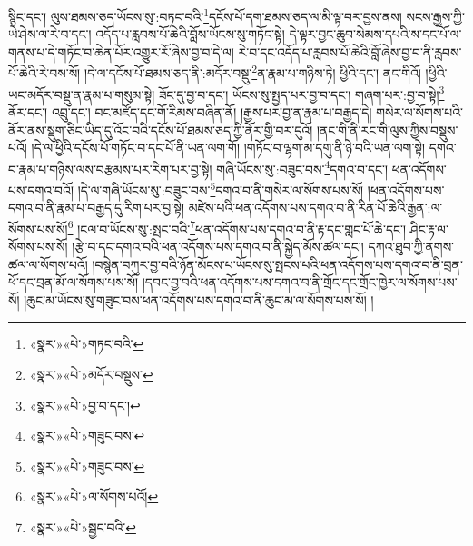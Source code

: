 སྙིང་དང་། ལུས་ཐམས་ཅད་ཡོངས་སུ་:བཏང་བའི་\footnote{«སྣར་»«པེ་»གཏང་བའི་}དངོས་པོ་དག་ཐམས་ཅད་ལ་མི་ལྟ་བར་བྱས་ནས། སངས་རྒྱས་ཀྱི་ཡེ་ཤེས་ལ་རེ་བ་དང་། འདོད་པ་རླབས་པོ་ཆེའི་བློས་ཡོངས་སུ་གཏོང་སྟེ། དེ་ལྟར་བྱང་ཆུབ་སེམས་དཔའི་ས་དང་པོ་ལ་གནས་པ་དེ་གཏོང་བ་ཆེན་པོར་འགྱུར་རོ་ཞེས་བྱ་བ་དེ་ལ། རེ་བ་དང་འདོད་པ་རླབས་པོ་ཆེའི་བློ་ཞེས་བྱ་བ་ནི་རླབས་པོ་ཆེའི་རེ་བས་སོ། །དེ་ལ་དངོས་པོ་ཐམས་ཅད་ནི་:མདོར་བསྡུ་\footnote{«སྣར་»«པེ་»མདོར་བསྡུས་}ན་རྣམ་པ་གཉིས་ཏེ། ཕྱིའི་དང་། ནང་གིའོ། །ཕྱིའི་ཡང་མདོར་བསྡུ་ན་རྣམ་པ་གསུམ་སྟེ། ཟོང་དུ་བྱ་བ་དང་། ཡོངས་སུ་སྤྱད་པར་བྱ་བ་དང་། གཞག་པར་:བྱ་བ་སྟེ།\footnote{«སྣར་»«པེ་»བྱ་བ་དང་།} ནོར་དང་། འབྲུ་དང་། བང་མཛོད་དང་གོ་རིམས་བཞིན་ནོ། །རྒྱས་པར་བྱ་ན་རྣམ་པ་བརྒྱད་དེ། གསེར་ལ་སོགས་པའི་ནོར་ནས་སྡུག་ཅིང་ཡིད་དུ་འོང་བའི་དངོས་པོ་ཐམས་ཅད་ཀྱི་ནོར་གྱི་བར་དུའོ། །ནང་གི་ནི་རང་གི་ལུས་ཀྱིས་བསྡུས་པའོ། །དེ་ལ་ཕྱིའི་དངོས་པོ་གཏོང་བ་དང་པོ་ནི་ཡན་ལག་གོ། །གཏོང་བ་ལྷག་མ་དགུ་ནི་ཉེ་བའི་ཡན་ལག་སྟེ། དགའ་བ་རྣམ་པ་གཉིས་ལས་བརྩམས་པར་རིག་པར་བྱ་སྟེ། གཞི་ཡོངས་སུ་:བཟུང་བས་\footnote{«སྣར་»«པེ་»གཟུང་བས་}དགའ་བ་དང་། ཕན་འདོགས་པས་དགའ་བའོ། །དེ་ལ་གཞི་ཡོངས་སུ་:བཟུང་བས་\footnote{«སྣར་»«པེ་»གཟུང་བས་}དགའ་བ་ནི་གསེར་ལ་སོགས་པས་སོ། །ཕན་འདོགས་པས་དགའ་བ་ནི་རྣམ་པ་བརྒྱད་དུ་རིག་པར་བྱ་སྟེ། མཛེས་པའི་ཕན་འདོགས་པས་དགའ་བ་ནི་རིན་པོ་ཆེའི་རྒྱན་:ལ་སོགས་པས་སོ།\footnote{«སྣར་»«པེ་»ལ་སོགས་པའོ།} །ངལ་བ་ཡོངས་སུ་:སྤང་བའི་\footnote{«སྣར་»«པེ་»སྦྱང་བའི་}ཕན་འདོགས་པས་དགའ་བ་ནི་རྟ་དང་གླང་པོ་ཆེ་དང་། ཤིང་རྟ་ལ་སོགས་པས་སོ། །རྩེ་བ་དང་དགའ་བའི་ཕན་འདོགས་པས་དགའ་བ་ནི་སྐྱེད་མོས་ཚལ་དང་། དཀའ་ཐུབ་ཀྱི་ནགས་ཚལ་ལ་སོགས་པའོ། །བསྙེན་བཀུར་བྱ་བའི་ཉོན་མོངས་པ་ཡོངས་སུ་སྤངས་པའི་ཕན་འདོགས་པས་དགའ་བ་ནི་བྲན་ཕོ་དང་བྲན་མོ་ལ་སོགས་པས་སོ། །དབང་བྱ་བའི་ཕན་འདོགས་པས་དགའ་བ་ནི་གྲོང་དང་གྲོང་ཁྱེར་ལ་སོགས་པས་སོ། །ཆུང་མ་ཡོངས་སུ་གཟུང་བས་ཕན་འདོགས་པས་དགའ་བ་ནི་ཆུང་མ་ལ་སོགས་པས་སོ། །
